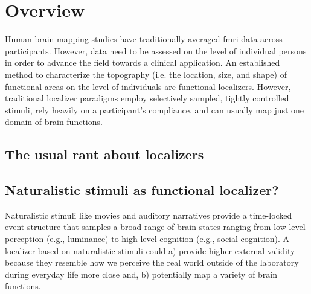 
\section{Overview}





Human brain mapping studies have traditionally averaged \ac{fmri} data across
participants.
%
However, data need to be assessed on the level of individual persons in order to
advance the field towards a clinical application.
An established method to characterize the topography (i.e. the location, size,
and shape) of functional areas on the level of individuals are functional
localizers.
However, traditional localizer paradigms employ selectively sampled, tightly
controlled stimuli, rely heavily on a participant's compliance, and can usually
map just one domain of brain functions.


\subsection{The usual rant about localizers}





\subsection{Naturalistic stimuli as functional localizer?}


Naturalistic stimuli like movies and auditory narratives \citep[cf.][for
reviews]{jaaskelainen2021movies, jaaskelainen2020neural} provide a time-locked
event structure that samples a broad range of brain states ranging from
low-level perception (e.g., luminance) to high-level cognition (e.g., social
cognition).
%
A localizer based on naturalistic stimuli could
%
a) provide higher external validity because they resemble how we perceive the
real world outside of the laboratory during everyday life more close and,
%
b) potentially map a variety of brain functions.

